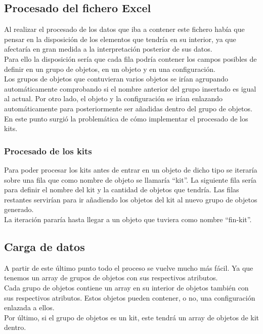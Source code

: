 \subsection{Procesado del fichero Excel}
Al realizar el procesado de los datos que iba a contener este fichero había que pensar en la disposición de los elementos que tendría en su interior, ya que afectaría en gran medida a la interpretación posterior de sus datos.
\\Para ello la disposición sería que cada fila podría contener los campos posibles de definir en un grupo de objetos, en un objeto y en una configuración.
\\Los grupos de objetos que contuvieran varios objetos se irían agrupando automáticamente comprobando si el nombre anterior del grupo insertado es igual al actual. Por otro lado, el objeto y la configuración se irían enlazando automáticamente para posteriormente ser añadidas dentro del grupo de objetos.
\\En este punto surgió la problemática de cómo implementar el procesado de los kits.

\subsubsection{Procesado de los kits}
Para poder procesar los kits antes de entrar en un objeto de dicho tipo se iteraría sobre una fila que como nombre de objeto se llamaría ``kit''. La siguiente fila sería para definir el nombre del kit y la cantidad de objetos que tendría. Las filas restantes servirían para ir añadiendo los objetos del kit al nuevo grupo de objetos generado.
\\La iteración pararía hasta llegar a un objeto que tuviera como nombre ``fin-kit''.


\subsection{Carga de datos}
A partir de este último punto todo el proceso se vuelve mucho más fácil. Ya que tenemos un array de grupos de objetos con sus respectivos atributos.
\\Cada grupo de objetos contiene un array en su interior de objetos también con sus respectivos atributos. Estos objetos pueden contener, o no, una configuración enlazada a ellos.
\\Por último, si el grupo de objetos es un kit, este tendrá un array de objetos de kit dentro.

